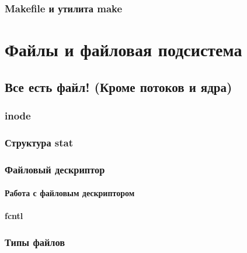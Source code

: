 \documentclass[oneside]{book}
\begin{document}
      \section{Makefile и утилита make}
      



\clearpage \part{Файлы и файловая подсистема}

   \chapter{Все есть файл! (Кроме потоков и ядра)}
   

      \section{inode}
      

         \section{Структура stat}
         

      \section{Файловый дескриптор}
      

         \subsection{Работа с файловым дескриптором}
         

         \subsection{fcntl}
         

      \section{Типы файлов}
      
\end{document}
